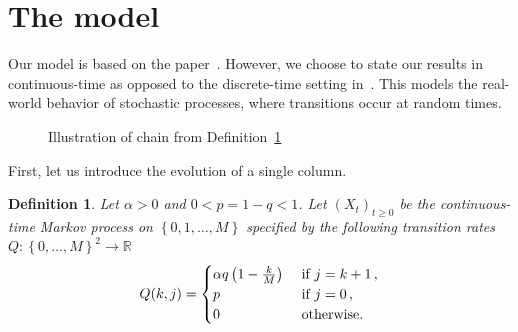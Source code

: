 \documentclass{article}
\numberwithin{equation}{section}
\newcommand{\gk}[1]{\left\{#1\right\}}
\newcommand{\rk}[1]{\left(#1\right)}
\newcommand{\R}     {\mathbb{R}}
\newcommand{\1}{\mathbbm{1}}
\newtheorem{definition}[lemma]{Definition}
\begin{document}
\section{The model}\label{sec:model}
Our model is based on the paper~\cite{kuehn2025mathematicalmodelsselfadaptiveresponse}. However, we choose to state our results in continuous-time as opposed to the discrete-time setting in~\cite{kuehn2025mathematicalmodelsselfadaptiveresponse}. This models the real-world behavior of stochastic processes, where transitions occur at random times.
\begin{figure}
    \centering
    \caption{Illustration of chain from Definition~\ref{def:singleCol}}
    \label{fig:singleCol}
\end{figure}
First, let us introduce the evolution of a single column.
\begin{definition}\label{def:singleCol}
    Let $\alpha>0$ and $0<p=1-q<1$. Let $\rk{X_t}_{t\ge 0}$ be the continuous-time Markov process on $\gk{0,1,\ldots, M}$ specified by the following transition rates $Q\colon \gk{0,\ldots,M}^2\to\R$
\begin{equation}
    Q(k,j)=\begin{cases}
        \alpha q\rk{1-\tfrac{k}{M}}&\textnormal{ if }j=k+1\, ,\\
        p&\textnormal{ if }j=0\, ,\\
        0&\textnormal{ otherwise.}
    \end{cases}
\end{equation}
\end{definition}
\end{document}
